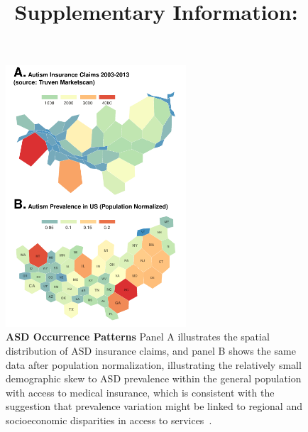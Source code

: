 \documentclass[onecolumn,,10pt]{IEEEtran}
\renewcommand{\captionN}[1]{\caption{\color{black} \sffamily \fontsize{9}{10}\selectfont #1  }}
\newif\ifFIGS
\begin{document}

\def\HCOL{\color{black}}
\title{{\Large\bf Supplementary Information:}\\\TITLE}
\maketitle

\tableofcontents
\listoftables

\clearpage



\clearpage
\ifFIGS
\begin{figure}[!ht]
  \centering
  \includegraphics[width=0.6\textwidth]{Figures/External/occurv}

  \captionN{\textbf{ASD Occurrence Patterns}  Panel A illustrates the spatial distribution of ASD insurance claims, and panel B shows the same data after population normalization, illustrating the relatively small demographic skew to ASD prevalence within the general population with access to medical insurance, which is consistent with the suggestion that prevalence variation might be linked to regional and socioeconomic disparities in access to services~\cite{jarquin2011racial}.}\label{figocc}
    \vspace{-5pt}

\end{figure}
\end{document}

